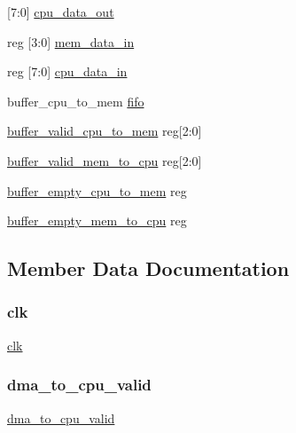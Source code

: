 \begin{DoxyCompactItemize}
\item 
\mbox{[}7\+:0\mbox{]} \mbox{\hyperlink{enumdma_a63dd3df5324f66dc3f1c60bf5999ef29}{cpu\+\_\+data\+\_\+out}}
\item 
reg \mbox{[}3\+:0\mbox{]} \mbox{\hyperlink{enumdma_a9915f2241fbb74c3f70857b53e7b7d71}{mem\+\_\+data\+\_\+in}}
\item 
reg \mbox{[}7\+:0\mbox{]} \mbox{\hyperlink{enumdma_a30462d21c7a22410c6f1dfda0c47c1a0}{cpu\+\_\+data\+\_\+in}}
\item 
buffer\+\_\+cpu\+\_\+to\+\_\+mem \mbox{\hyperlink{enumdma_aae0a35ee18bd585d93077404ec59bb29}{fifo}}
\item 
\mbox{\hyperlink{enumdma_a6960126d1f81033b251f52fa60128d67}{buffer\+\_\+valid\+\_\+cpu\+\_\+to\+\_\+mem}} reg\mbox{[}2\+:0\mbox{]}
\item 
\mbox{\hyperlink{enumdma_a99a56ad3a0ba7758b4e47e1c598610b9}{buffer\+\_\+valid\+\_\+mem\+\_\+to\+\_\+cpu}} reg\mbox{[}2\+:0\mbox{]}
\item 
\mbox{\hyperlink{enumdma_a5f20405a60143989302bdabc9d9f4fa6}{buffer\+\_\+empty\+\_\+cpu\+\_\+to\+\_\+mem}} reg
\item 
\mbox{\hyperlink{enumdma_ad59cb5889c658ccad5feda1cdc17f839}{buffer\+\_\+empty\+\_\+mem\+\_\+to\+\_\+cpu}} reg
\end{DoxyCompactItemize}


\subsection{Member Data Documentation}
\mbox{\label{enumdma_a0481abb8206ba22fcd1bad5db283afd1}} 
\subsubsection{\texorpdfstring{clk}{clk}}
{\footnotesize\ttfamily \mbox{\hyperlink{enumdma_a0481abb8206ba22fcd1bad5db283afd1}{clk}} \hspace{0.3cm}{\ttfamily [Input]}}

\mbox{\label{enumdma_afe45981e0efd23c51407c4ce3c4ee37e}} 
\subsubsection{\texorpdfstring{dma\+\_\+to\+\_\+cpu\+\_\+valid}{dma\_to\_cpu\_valid}}
{\footnotesize\ttfamily \mbox{\hyperlink{enumdma_afe45981e0efd23c51407c4ce3c4ee37e}{dma\+\_\+to\+\_\+cpu\+\_\+valid}} \hspace{0.3cm}{\ttfamily [Output]}}

